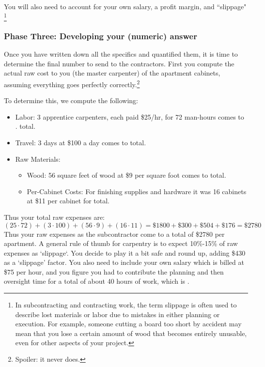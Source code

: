 \documentclass{ximeraXloud}
\begin{document}
    You will also need to account for your own salary, a profit margin, and ``slippage"
    \footnote{In subcontracting and contracting work, the term slippage is often used to describe lost materials or labor due to mistakes in either planning or execution. For example, someone cutting a board too short by accident may mean that you lose a certain amount of wood that becomes entirely unusable, even for other aspects of your project.}

\subsubsection*{Phase Three: Developing your (numeric) answer}
    Once you have written down all the specifics and quantified them, it is time to determine the final number to send to the contractors. First you compute the actual raw cost to you (the master carpenter) of the apartment cabinets, assuming everything goes perfectly correctly.\footnote{Spoiler: it never does.}
    
    To determine this, we compute the following:
    \begin{itemize}
        \item Labor: 3 apprentice carpenters, each paid \$25/hr, for 72 man-hours comes to . total.
        \item Travel: 3 days at \$100 a day comes to  total.
        \item Raw Materials:
        \begin{itemize}
            \item Wood: 56 square feet of wood at \$9 per square foot comes to  total.
            \item Per-Cabinet Costs: For finishing supplies and hardware it was 16 cabinets at \$11 per cabinet for  total.
        \end{itemize}
    \end{itemize}
    Thus your total raw expenses are:
    \[
        (25\cdot 72) + (3\cdot 100) + (56\cdot 9) + (16\cdot 11) = \$1800 + \$300 + \$504 + \$176 = \$2780
    \]
    Thus your raw expenses as the subcontractor come to a total of \$2780 per apartment. A general rule of thumb for carpentry is to expect 10\%-15\% of raw expenses as `slippage`. You decide to play it a bit safe and round up, adding \$430 as a `slippage' factor. You also need to include your own salary which is billed at \$75 per hour, and you figure you had to contribute the planning and then oversight time for a total of about 40 hours of work, which is .
    
\end{document}
